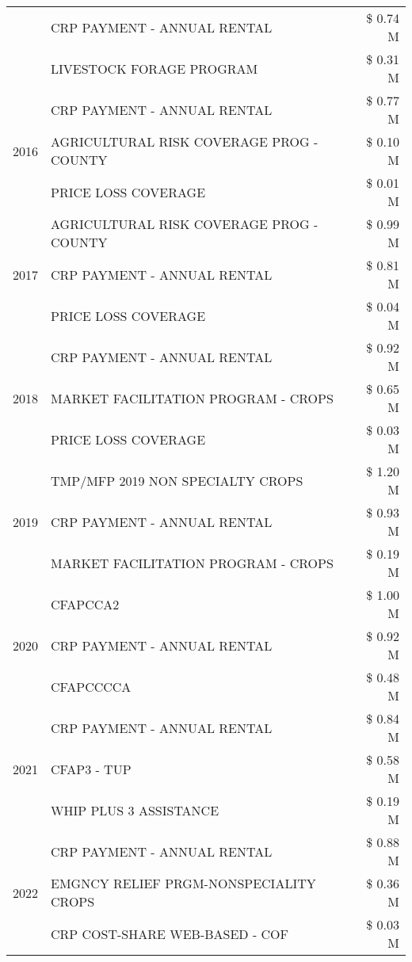 \begin{tabular}{llr}
 & CRP PAYMENT - ANNUAL RENTAL & \$ 0.74 M \\
 & LIVESTOCK FORAGE PROGRAM & \$ 0.31 M \\
\cline{1-3}
\multirow[t]{3}{*}{2016} & CRP PAYMENT - ANNUAL RENTAL & \$ 0.77 M \\
 & AGRICULTURAL RISK COVERAGE PROG - COUNTY & \$ 0.10 M \\
 & PRICE LOSS COVERAGE & \$ 0.01 M \\
\cline{1-3}
\multirow[t]{3}{*}{2017} & AGRICULTURAL RISK COVERAGE PROG - COUNTY & \$ 0.99 M \\
 & CRP PAYMENT - ANNUAL RENTAL & \$ 0.81 M \\
 & PRICE LOSS COVERAGE & \$ 0.04 M \\
\cline{1-3}
\multirow[t]{3}{*}{2018} & CRP PAYMENT - ANNUAL RENTAL & \$ 0.92 M \\
 & MARKET FACILITATION PROGRAM - CROPS & \$ 0.65 M \\
 & PRICE LOSS COVERAGE & \$ 0.03 M \\
\cline{1-3}
\multirow[t]{3}{*}{2019} & TMP/MFP 2019 NON SPECIALTY CROPS & \$ 1.20 M \\
 & CRP PAYMENT - ANNUAL RENTAL & \$ 0.93 M \\
 & MARKET FACILITATION PROGRAM - CROPS & \$ 0.19 M \\
\cline{1-3}
\multirow[t]{3}{*}{2020} & CFAPCCA2 & \$ 1.00 M \\
 & CRP PAYMENT - ANNUAL RENTAL & \$ 0.92 M \\
 & CFAPCCCCA & \$ 0.48 M \\
\cline{1-3}
\multirow[t]{3}{*}{2021} & CRP PAYMENT - ANNUAL RENTAL & \$ 0.84 M \\
 & CFAP3 - TUP & \$ 0.58 M \\
 & WHIP PLUS 3 ASSISTANCE & \$ 0.19 M \\
\cline{1-3}
\multirow[t]{3}{*}{2022} & CRP PAYMENT - ANNUAL RENTAL & \$ 0.88 M \\
 & EMGNCY RELIEF PRGM-NONSPECIALITY CROPS & \$ 0.36 M \\
 & CRP COST-SHARE WEB-BASED - COF & \$ 0.03 M \\
\cline{1-3}
\bottomrule
\end{tabular}
